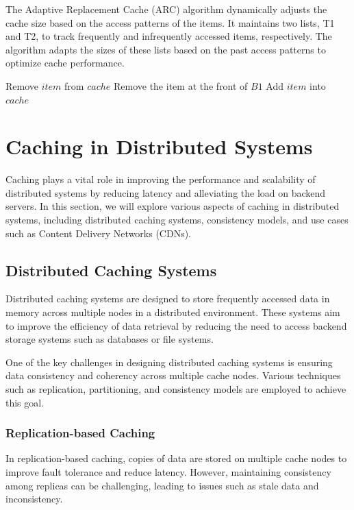 \documentclass[12pt]{book} %
\begin{document}
The Adaptive Replacement Cache (ARC) algorithm dynamically adjusts the cache size based on the access patterns of the items. It maintains two lists, T1 and T2, to track frequently and infrequently accessed items, respectively. The algorithm adapts the sizes of these lists based on the past access patterns to optimize cache performance.
\FloatBarrier
\begin{algorithm}
\caption{Adaptive Replacement Cache (ARC)}
\begin{algorithmic}[1]
            \State Remove $item$ from $cache$
        \Else
            \State Remove the item at the front of $B1$
        \EndIf
    \EndIf
    \State Add $item$ into $cache$
\EndFunction
\end{algorithmic}
\end{algorithm}


\section{Caching in Distributed Systems}

Caching plays a vital role in improving the performance and scalability of distributed systems by reducing latency and alleviating the load on backend servers. In this section, we will explore various aspects of caching in distributed systems, including distributed caching systems, consistency models, and use cases such as Content Delivery Networks (CDNs).

\subsection{Distributed Caching Systems}

Distributed caching systems are designed to store frequently accessed data in memory across multiple nodes in a distributed environment. These systems aim to improve the efficiency of data retrieval by reducing the need to access backend storage systems such as databases or file systems.

One of the key challenges in designing distributed caching systems is ensuring data consistency and coherency across multiple cache nodes. Various techniques such as replication, partitioning, and consistency models are employed to achieve this goal.

\subsubsection{Replication-based Caching}
In replication-based caching, copies of data are stored on multiple cache nodes to improve fault tolerance and reduce latency. However, maintaining consistency among replicas can be challenging, leading to issues such as stale data and inconsistency.
\end{document}
